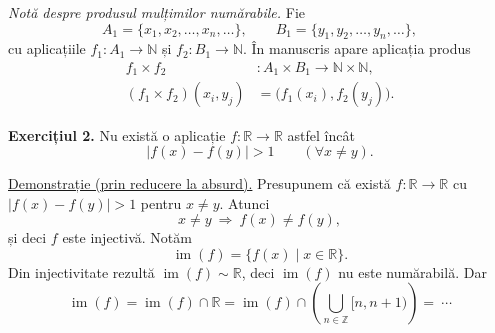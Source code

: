 \medskip
\noindent\emph{Notă despre produsul mulțimilor numărabile.}
Fie
\[
 A_1=\{x_1,x_2,\ldots,x_n,\ldots\},\qquad
 B_1=\{y_1,y_2,\ldots,y_n,\ldots\},
\]
cu aplicațiile $f_1:A_1\to\mathbb N$ și $f_2:B_1\to\mathbb N$.
În manuscris apare aplicația produs
\[
\begin{aligned}
 f_1\times f_2 &: A_1\times B_1\longrightarrow
                    \mathbb N\times\mathbb N,\\
 (f_1\times f_2)(x_i,y_j)
   &=\bigl(f_1(x_i),f_2(y_j)\bigr).
\end{aligned}
\]

\medskip
\noindent\textbf{Exercițiul 2.} Nu există o aplicație
$f:\mathbb R\to\mathbb R$ astfel încât
\[
 |f(x)-f(y)|>1\qquad(\forall x\neq y).
\]

\noindent\underline{Demonstrație (prin reducere la absurd).}
Presupunem că există $f:\mathbb R\to\mathbb R$ cu
$|f(x)-f(y)|>1$ pentru $x\neq y$. Atunci
\[
 x\neq y\ \Longrightarrow\ f(x)\neq f(y),
\]
și deci $f$ este injectivă. Notăm
\[
 \operatorname{im}(f)=\{f(x)\mid x\in\mathbb R\}.
\]
Din injectivitate rezultă
$\operatorname{im}(f)\sim\mathbb R$, deci
$\operatorname{im}(f)$ nu este numărabilă.
Dar
\[
 \operatorname{im}(f)
  =\operatorname{im}(f)\cap\mathbb R
  =\operatorname{im}(f)\cap
     \left(\bigcup_{n\in\mathbb Z}[n,n+1)\right)
  =\ \cdots
\]
